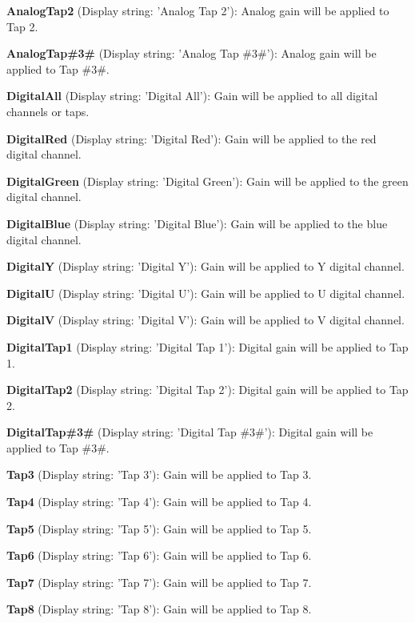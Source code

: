 \begin{DoxyItemize}
\item {\bfseries Analog\+Tap2} (Display string\+: 'Analog Tap 2')\+: Analog gain will be applied to Tap 2.
\item {\bfseries Analog\+Tap\#3\#} (Display string\+: 'Analog Tap \#3\#')\+: Analog gain will be applied to Tap \#3\#.
\item {\bfseries Digital\+All} (Display string\+: 'Digital All')\+: Gain will be applied to all digital channels or taps.
\item {\bfseries Digital\+Red} (Display string\+: 'Digital Red')\+: Gain will be applied to the red digital channel.
\item {\bfseries Digital\+Green} (Display string\+: 'Digital Green')\+: Gain will be applied to the green digital channel.
\item {\bfseries Digital\+Blue} (Display string\+: 'Digital Blue')\+: Gain will be applied to the blue digital channel.
\item {\bfseries Digital\+Y} (Display string\+: 'Digital Y')\+: Gain will be applied to Y digital channel.
\item {\bfseries Digital\+U} (Display string\+: 'Digital U')\+: Gain will be applied to U digital channel.
\item {\bfseries Digital\+V} (Display string\+: 'Digital V')\+: Gain will be applied to V digital channel.
\item {\bfseries Digital\+Tap1} (Display string\+: 'Digital Tap 1')\+: Digital gain will be applied to Tap 1.
\item {\bfseries Digital\+Tap2} (Display string\+: 'Digital Tap 2')\+: Digital gain will be applied to Tap 2.
\item {\bfseries Digital\+Tap\#3\#} (Display string\+: 'Digital Tap \#3\#')\+: Digital gain will be applied to Tap \#3\#.
\item {\bfseries Tap3} (Display string\+: 'Tap 3')\+: Gain will be applied to Tap 3.
\item {\bfseries Tap4} (Display string\+: 'Tap 4')\+: Gain will be applied to Tap 4.
\item {\bfseries Tap5} (Display string\+: 'Tap 5')\+: Gain will be applied to Tap 5.
\item {\bfseries Tap6} (Display string\+: 'Tap 6')\+: Gain will be applied to Tap 6.
\item {\bfseries Tap7} (Display string\+: 'Tap 7')\+: Gain will be applied to Tap 7.
\item {\bfseries Tap8} (Display string\+: 'Tap 8')\+: Gain will be applied to Tap 8.

\end{DoxyItemize}
